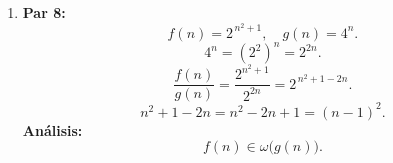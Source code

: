 \documentclass[12pt]{article}
\begin{document}
\begin{enumerate}
  \item \textbf{Par 8:}
  \[
    f(n) = 2^{\,n^2 + 1}, \quad g(n) = 4^n.
  \]
  \[
    4^n = (2^2)^n = 2^{2n}.
  \]
  \[
    \frac{f(n)}{g(n)} = \frac{2^{n^2+1}}{2^{2n}} = 2^{\,n^2 + 1 - 2n}.
  \]
  \[
    n^2 + 1 - 2n = n^2 - 2n + 1 = (n-1)^2.
  \]
  \textbf{Análisis:}
  \[
    f(n) \in \omega\bigl(g(n)\bigr).
  \]

\end{enumerate}
\end{document}
